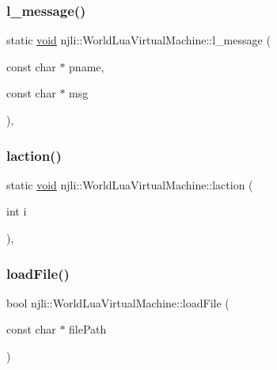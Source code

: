 \subsubsection{\texorpdfstring{l\+\_\+message()}{l\_message()}}
{\footnotesize\ttfamily static \mbox{\hyperlink{_thread_8h_af1e856da2e658414cb2456cb6f7ebc66}{void}} njli\+::\+World\+Lua\+Virtual\+Machine\+::l\+\_\+message (\begin{DoxyParamCaption}\item[{const char $\ast$}]{pname,  }\item[{const char $\ast$}]{msg }\end{DoxyParamCaption})\hspace{0.3cm}{\ttfamily [static]}, {\ttfamily [private]}}

\mbox{\label{classnjli_1_1_world_lua_virtual_machine_a84c29e3d8208c634419d1974c63ad245}} 
\subsubsection{\texorpdfstring{laction()}{laction()}}
{\footnotesize\ttfamily static \mbox{\hyperlink{_thread_8h_af1e856da2e658414cb2456cb6f7ebc66}{void}} njli\+::\+World\+Lua\+Virtual\+Machine\+::laction (\begin{DoxyParamCaption}\item[{int}]{i }\end{DoxyParamCaption})\hspace{0.3cm}{\ttfamily [static]}, {\ttfamily [private]}}

\mbox{\label{classnjli_1_1_world_lua_virtual_machine_adc172de3b59b78472ff5867f5e16041c}} 
\subsubsection{\texorpdfstring{load\+File()}{loadFile()}}
{\footnotesize\ttfamily bool njli\+::\+World\+Lua\+Virtual\+Machine\+::load\+File (\begin{DoxyParamCaption}\item[{const char $\ast$}]{file\+Path }\end{DoxyParamCaption})}



